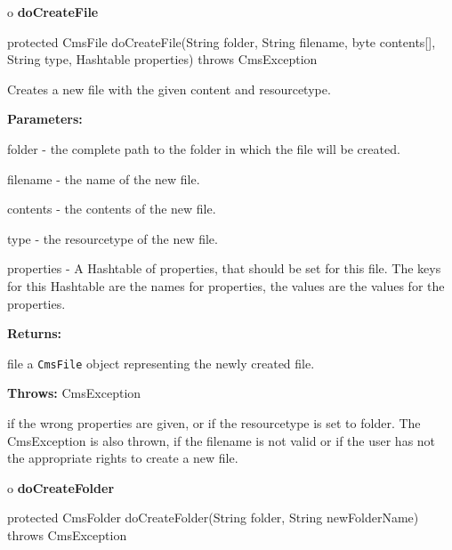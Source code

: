 o {\bf doCreateFile} 

\begin{PRE}
 protected CmsFile doCreateFile(String folder,
                                String filename,
                                byte contents[],
                                String type,
                                Hashtable properties) throws CmsException
\end{PRE}

\begin{description}
\htmlDD Creates a new file with the given content and resourcetype. 

\begin{description}
\item {\bf Parameters:}  

folder - the complete path to the folder in which the file will be created.  

filename - the name of the new file.  

contents - the contents of the new file.  

type - the resourcetype of the new file.  

properties - A Hashtable of properties, that should be set for this file. The
keys for this Hashtable are the names for properties, the values are the
values for the properties.  
\item {\bf Returns:}  

file a {\tt CmsFile} object representing the newly created file.  
\item {\bf Throws:} CmsException  

if the wrong properties are given, or if the resourcetype is set to folder.
The CmsException is also thrown, if the filename is not valid or if the user
has not the appropriate rights to create a new file.  
\end{description}

\end{description}

o {\bf doCreateFolder} 

\begin{PRE}
 protected CmsFolder doCreateFolder(String folder,
                                    String newFolderName) throws CmsException
\end{PRE}

